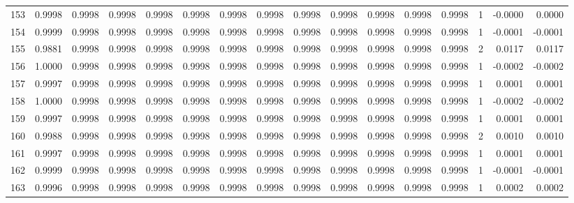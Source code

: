 \begin{tabular}{lrrrrrrrrrrrrrrr}
153 &      0.9998 &  0.9998 &  0.9998 &  0.9998 &  0.9998 &  0.9998 &  0.9998 &  0.9998 &  0.9998 &  0.9998 &   0.9998 &     0.9998 &      1 &                   -0.0000 &                     0.0000 \\
154 &      0.9999 &  0.9998 &  0.9998 &  0.9998 &  0.9998 &  0.9998 &  0.9998 &  0.9998 &  0.9998 &  0.9998 &   0.9998 &     0.9998 &      1 &                   -0.0001 &                    -0.0001 \\
155 &      0.9881 &  0.9998 &  0.9998 &  0.9998 &  0.9998 &  0.9998 &  0.9998 &  0.9998 &  0.9998 &  0.9998 &   0.9998 &     0.9998 &      2 &                    0.0117 &                     0.0117 \\
156 &      1.0000 &  0.9998 &  0.9998 &  0.9998 &  0.9998 &  0.9998 &  0.9998 &  0.9998 &  0.9998 &  0.9998 &   0.9998 &     0.9998 &      1 &                   -0.0002 &                    -0.0002 \\
157 &      0.9997 &  0.9998 &  0.9998 &  0.9998 &  0.9998 &  0.9998 &  0.9998 &  0.9998 &  0.9998 &  0.9998 &   0.9998 &     0.9998 &      1 &                    0.0001 &                     0.0001 \\
158 &      1.0000 &  0.9998 &  0.9998 &  0.9998 &  0.9998 &  0.9998 &  0.9998 &  0.9998 &  0.9998 &  0.9998 &   0.9998 &     0.9998 &      1 &                   -0.0002 &                    -0.0002 \\
159 &      0.9997 &  0.9998 &  0.9998 &  0.9998 &  0.9998 &  0.9998 &  0.9998 &  0.9998 &  0.9998 &  0.9998 &   0.9998 &     0.9998 &      1 &                    0.0001 &                     0.0001 \\
160 &      0.9988 &  0.9998 &  0.9998 &  0.9998 &  0.9998 &  0.9998 &  0.9998 &  0.9998 &  0.9998 &  0.9998 &   0.9998 &     0.9998 &      2 &                    0.0010 &                     0.0010 \\
161 &      0.9997 &  0.9998 &  0.9998 &  0.9998 &  0.9998 &  0.9998 &  0.9998 &  0.9998 &  0.9998 &  0.9998 &   0.9998 &     0.9998 &      1 &                    0.0001 &                     0.0001 \\
162 &      0.9999 &  0.9998 &  0.9998 &  0.9998 &  0.9998 &  0.9998 &  0.9998 &  0.9998 &  0.9998 &  0.9998 &   0.9998 &     0.9998 &      1 &                   -0.0001 &                    -0.0001 \\
163 &      0.9996 &  0.9998 &  0.9998 &  0.9998 &  0.9998 &  0.9998 &  0.9998 &  0.9998 &  0.9998 &  0.9998 &   0.9998 &     0.9998 &      1 &                    0.0002 &                     0.0002 \\

\end{tabular}
